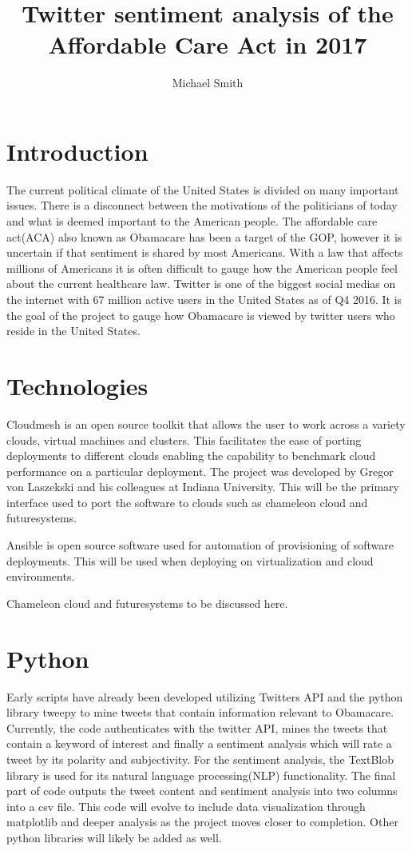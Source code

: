\documentclass[9pt,twocolumn,twoside]{styles/osajnl}
\title{Twitter sentiment analysis of the Affordable Care Act in 2017}
\author[1]{Michael Smith}
\affil[1]{School of Informatics and Computing, Bloomington, IN 47408, U.S.A.}
\affil[*]{Corresponding authors: mls35@iu.edu}
\begin{document}
\maketitle

\section{Introduction}
The current political climate of the United States is divided on many important issues.  There is a disconnect between the motivations of the politicians of today and what is deemed important to the American people.  The affordable care act(ACA) also known as Obamacare has been a target of the GOP, however it is uncertain if that sentiment is shared by most Americans.  With a law that affects millions of Americans it is often difficult to gauge how the American people feel about the current healthcare law.  Twitter is one of the biggest social medias on the internet with 67 million active users in the United States as of Q4 2016.\cite{www-statista}  It is the goal of the project to gauge how Obamacare is viewed by twitter users who reside in the United States.  

\section{Technologies}

Cloudmesh is an open source toolkit that allows the user to work across a variety clouds, virtual machines and clusters.  This facilitates the ease of porting deployments to different clouds enabling the capability to benchmark cloud performance on a particular deployment. \cite{www-cloudmesh}  The project was developed by Gregor von Laszekski and his colleagues at Indiana University.  This will be the primary interface used to port the software to clouds such as chameleon cloud and futuresystems.

Ansible is open source software used for automation of provisioning of software deployments.  This will be used when deploying on virtualization and cloud environments.

Chameleon cloud and futuresystems to be discussed here.

\section{Python}

Early scripts have already been developed utilizing Twitters API and the python library tweepy to mine tweets that contain information relevant to Obamacare. Currently, the code authenticates with the twitter API, mines the tweets that contain a keyword of interest and finally a sentiment analysis which will rate a tweet by its polarity and subjectivity.  For the sentiment analysis, the TextBlob library is used for its natural language processing(NLP) functionality. The final part of code outputs the tweet content and sentiment analysis into two columns into a csv file.
This code will evolve to include data visualization through matplotlib and deeper analysis as the project moves closer to completion.  Other python libraries will likely be added as well.
\end{document}
